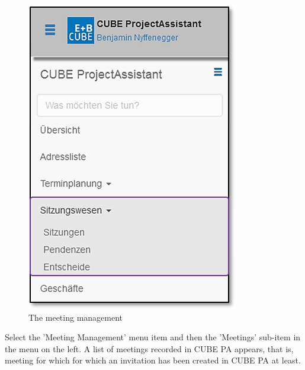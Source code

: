 \vspace{\baselineskip}

\begin{figure}   %
  \vspace{-35pt}      %
  \begin{center}
    \includegraphics[width=1\linewidth]{../chapters/05_Sitzungswesen/pictures/5-1_Menu_Sitzungswesen.jpg}
  \end{center}
  \vspace{-20pt}
  \caption{The meeting management}
  \vspace{-10pt}
\end{figure}

Select the 'Meeting Management' menu item and then the 'Meetings' sub-item in the menu on the left. A list of meetings recorded in CUBE PA appears, that is, meeting for which for which an invitation has been created in CUBE PA at least. \newline

